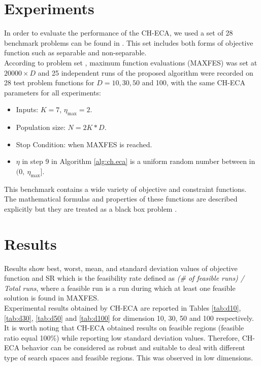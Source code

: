 \documentclass[conference]{IEEEtran}
\begin{document}

\section{Experiments} %
\label{sec:experiments}

In order to evaluate the performance of the CH-ECA, we used a set of
28 benchmark problems can be found in \cite{cecCop17}. This set includes both 
forms of objective function such as separable and non-separable.\\

According to problem set \cite{cecCop17}, maximum function evaluations (MAXFES) 
was set at $20000 \times D$ and 25 independent runs of the proposed algorithm 
were recorded on 28 test problem functions for $D = 10, 30, 50$ and 100, with 
the same CH-ECA parameters for all experiments:

\begin{itemize}
	\item Inputs: $K = 7$, $\eta_{\max} = 2$. 
	\item Population size: $N = 2K * D$.
	\item Stop Condition: when MAXFES is reached.
	\item $\eta$ in step 9 in Algorithm \ref{alg:ch.eca} is a uniform random 
		  number between in $(0,\ \eta_{\max} ]$.
\end{itemize}

This benchmark contains a wide variety of objective and constraint functions. The 
mathematical formulas and properties of these functions are described explicitly 
but they are treated as a black box problem \cite{jones1998efficient}.


\section{Results} %
\label{sec:results}

Results show best, worst, mean, and standard deviation values of objective 
function  and SR which is the feasibility rate defined as 
\textit{(\# of feasible runs) / Total runs},  where a feasible run is a run 
during which at least one feasible solution is found in MAXFES.\\
% 

Experimental results obtained by CH-ECA are reported in Tables \ref{tab:d10}, \ref{tab:d30}, 
\ref{tab:d50} and \ref{tab:d100} for dimension 10, 30, 50 and 100 respectively. 
It is worth noting that CH-ECA obtained results on feasible regions (feasible 
ratio equal 100\%) while reporting low standard deviation values. Therefore, CH-ECA 
behavior can be considered as robust and suitable to deal with different type of 
search spaces and feasible regions. This was observed in low dimensions. \\
% 
\end{document}
